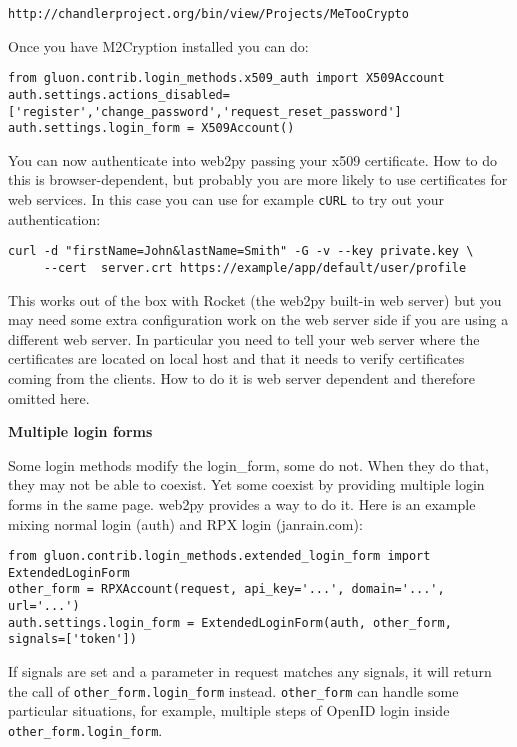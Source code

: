 \documentclass[justified,sixbynine,notoc]{tufte-book}
\def\ft{\small\tt}
\begin{document}
\begin{fullwidth}
\begin{lstlisting}[keywords={}]
http://chandlerproject.org/bin/view/Projects/MeTooCrypto
\end{lstlisting}

Once you have M2Cryption installed you can do:

\begin{lstlisting}
from gluon.contrib.login_methods.x509_auth import X509Account
auth.settings.actions_disabled=['register','change_password','request_reset_password']
auth.settings.login_form = X509Account()
\end{lstlisting}

You can now authenticate into web2py passing your x509 certificate. How to do this is browser-dependent, but probably you are more likely to use certificates for web services. In this case you can use for example {\ft cURL} to try out your authentication:

\begin{lstlisting}
curl -d "firstName=John&lastName=Smith" -G -v --key private.key \
     --cert  server.crt https://example/app/default/user/profile
\end{lstlisting}

This works out of the box with Rocket (the web2py built-in web server) but you may need some extra configuration work on the web server side if you are using a different web server. In particular you need to tell your web server where the certificates are located on local host and that it needs to verify certificates coming from the clients. How to do it is web server dependent and therefore omitted here.

{\bf Multiple login forms}

Some login methods modify the login\_form, some do not. When they do that, they may not be able to coexist. Yet some coexist by providing multiple login forms in the same page. web2py provides a way to do it. Here is an example mixing normal login (auth) and RPX login (janrain.com):

\begin{lstlisting}
from gluon.contrib.login_methods.extended_login_form import ExtendedLoginForm
other_form = RPXAccount(request, api_key='...', domain='...', url='...')
auth.settings.login_form = ExtendedLoginForm(auth, other_form, signals=['token'])
\end{lstlisting}

If signals are set and a parameter in request matches any signals,
it will return the call of {\ft other\_form.login\_form} instead.
{\ft other\_form} can handle some particular situations, for example,
multiple steps of OpenID login inside {\ft other\_form.login\_form}.


\end{fullwidth}
\end{document}
